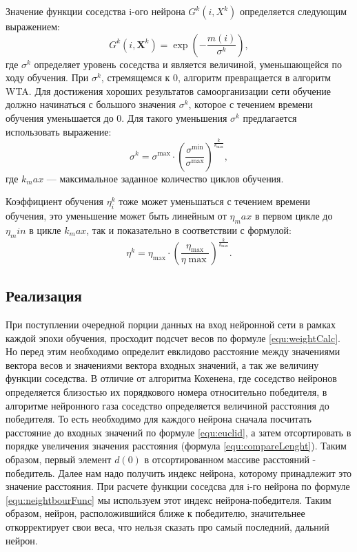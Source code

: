 Значение функции соседства i-ого нейрона $G^k(i,X^k)$ определяется следующим выражением:
\begin{equation}\label{equ:neightbourFunc}
G ^ { k } \left( i , \mathbf { X } ^ { k } \right) = \exp \left( - \frac { m ( i ) } { \sigma ^ { k } } \right),
\end{equation}
где $\sigma ^k$ определяет уровень соседства и является величиной, уменьшающейся по ходу обучения. При $\sigma ^k$, стремящемся к 0, алгоритм превращается в алгоритм WTA. Для достижения хороших результатов самоорганизации сети обучение должно начинаться с большого значения $\sigma ^k$, которое с течением времени обучения уменьшается до 0. Для такого уменьшения $\sigma ^k$ предлагается использовать выражение:
\begin{equation}\label{equ:sigma}
    \sigma ^ { k } = \sigma ^ { \max } \cdot \left( \frac { \sigma ^ { \min } } { \sigma ^ { \max } } \right) ^ { \frac { k } { k _ { \max } } },
\end{equation}
где $k_max$ — максимальное заданное количество циклов обучения.

Коэффициент обучения $\eta_i^k$ тоже может уменьшаться с течением времени обучения, это уменьшение может быть линейным от $\eta_max$ в первом цикле до $\eta_min$ в цикле $k_max$, так и показательно в соответствии с формулой:
\begin{equation}\label{equ:eta}
    \eta ^ { k } = \eta _ { \max } \cdot \left( \frac { \eta _ { \max } } { \eta \max } \right) ^ { \frac { k } { k _ { \max } } }.
\end{equation}


\subsection{Реализация}

При поступлении очередной порции данных на вход нейронной сети в рамках каждой эпохи обучения, просходит подсчет весов по формуле \eqref{equ:weightCalc}. Но перед этим необходимо определит евклидово расстояние между значениями вектора весов и значениями вектора входных значений, а так же величину функции соседства. В отличие от алгоритма Кохенена, где соседство нейронов определяется близостью их порядкового номера относительно победителя, в алгоритме нейронного газа соседство определяется величиной расстояния до победителя. То есть необходимо для каждого нейрона сначала посчитать расстояние до входных значений по формуле \eqref{equ:euclid}, а затем отсортировать в порядке увеличения значения расстояния (формула \eqref{equ:compareLenght}). Таким образом, первый элемент $d(0)$ в отсортированном массиве расстояний - победитель. Далее нам надо получить индекс нейрона, которому принадлежит это значение расстояния. При расчете функции соседсва для i-го нейрона по формуле \eqref{equ:neightbourFunc} мы используем этот индекс нейрона-победителя. Таким образом, нейрон, расположившийся ближе к победителю, значительнее откорректирует свои веса, что нельзя сказать про самый последний, дальний нейрон.

